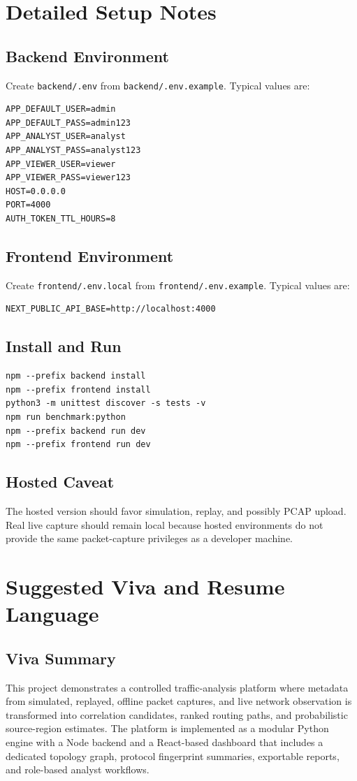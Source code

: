 \documentclass[12pt,a4paper]{report}
\begin{document}
\chapter{Detailed Setup Notes}
\section{Backend Environment}
Create \texttt{backend/.env} from \texttt{backend/.env.example}. Typical values are:
\begin{lstlisting}[style=codeblock]
APP_DEFAULT_USER=admin
APP_DEFAULT_PASS=admin123
APP_ANALYST_USER=analyst
APP_ANALYST_PASS=analyst123
APP_VIEWER_USER=viewer
APP_VIEWER_PASS=viewer123
HOST=0.0.0.0
PORT=4000
AUTH_TOKEN_TTL_HOURS=8
\end{lstlisting}

\section{Frontend Environment}
Create \texttt{frontend/.env.local} from \texttt{frontend/.env.example}. Typical values are:
\begin{lstlisting}[style=codeblock]
NEXT_PUBLIC_API_BASE=http://localhost:4000
\end{lstlisting}

\section{Install and Run}
\begin{lstlisting}[style=codeblock]
npm --prefix backend install
npm --prefix frontend install
python3 -m unittest discover -s tests -v
npm run benchmark:python
npm --prefix backend run dev
npm --prefix frontend run dev
\end{lstlisting}

\section{Hosted Caveat}
The hosted version should favor simulation, replay, and possibly PCAP upload. Real live capture should remain local because hosted environments do not provide the same packet-capture privileges as a developer machine.

\chapter{Suggested Viva and Resume Language}
\section{Viva Summary}
This project demonstrates a controlled traffic-analysis platform where metadata from simulated, replayed, offline packet captures, and live network observation is transformed into correlation candidates, ranked routing paths, and probabilistic source-region estimates. The platform is implemented as a modular Python engine with a Node backend and a React-based dashboard that includes a dedicated topology graph, protocol fingerprint summaries, exportable reports, and role-based analyst workflows.
\end{document}

